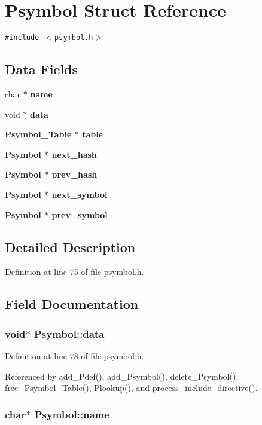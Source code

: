 \section{Psymbol Struct Reference}
\label{structPsymbol}
{\tt \#include $<$psymbol.h$>$}

\subsection*{Data Fields}
\begin{CompactItemize}
\item 
char $\ast$ \bf{name}
\item 
void $\ast$ \bf{data}
\item 
\bf{Psymbol\_\-Table} $\ast$ \bf{table}
\item 
\bf{Psymbol} $\ast$ \bf{next\_\-hash}
\item 
\bf{Psymbol} $\ast$ \bf{prev\_\-hash}
\item 
\bf{Psymbol} $\ast$ \bf{next\_\-symbol}
\item 
\bf{Psymbol} $\ast$ \bf{prev\_\-symbol}
\end{CompactItemize}


\subsection{Detailed Description}




Definition at line 75 of file psymbol.h.

\subsection{Field Documentation}
\subsubsection{\setlength{\rightskip}{0pt plus 5cm}void$\ast$ \bf{Psymbol::data}}\label{structPsymbol_473e052efc6e8d1e777844a035173647}




Definition at line 78 of file psymbol.h.

Referenced by add\_\-Pdef(), add\_\-Psymbol(), delete\_\-Psymbol(), free\_\-Psymbol\_\-Table(), Plookup(), and process\_\-include\_\-directive().
\subsubsection{\setlength{\rightskip}{0pt plus 5cm}char$\ast$ \bf{Psymbol::name}}\label{structPsymbol_9e099101015e8a764a9759c071f4b0f3}





